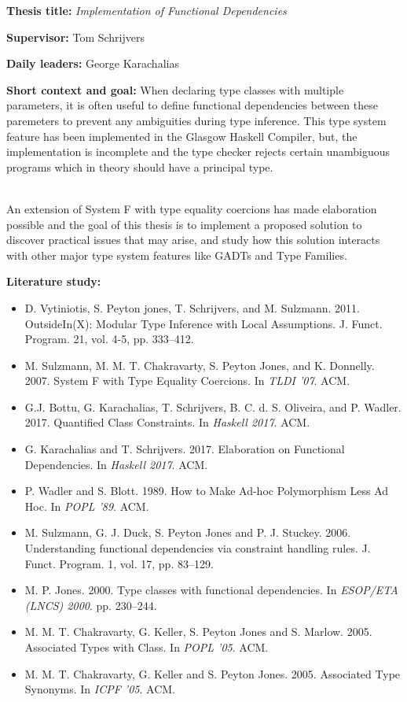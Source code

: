 \documentclass[12pt]{report}
\begin{document}
\pagestyle{myheadings}

{\bf Thesis title:} {\em Implementation of Functional Dependencies}

\vspace{0.5cm}
{\bf Supervisor:} Tom Schrijvers


\vspace{0.5cm}
{\bf Daily leaders:} George Karachalias

\vspace{.5cm}
{\bf Short context and goal: }
When declaring type classes with multiple parameters, it is often useful to
define functional dependencies between these paremeters to prevent any
ambiguities during type inference. This type system feature has been implemented
in the Glasgow Haskell Compiler, but, the implementation is incomplete and the
type checker rejects certain unambiguous programs which in theory should have a
principal type.

\mbox{}\\
An extension of System F with type equality coercions has made elaboration
possible and the goal of this thesis is to implement a proposed solution to
discover practical issues that may arise, and study how this solution interacts
with other major type system features like GADTs and Type Families.

\vspace{.5cm}
{\bf Literature study:}
\begin{itemize}
\item
  D. Vytiniotis, S. Peyton jones, T. Schrijvers, and M. Sulzmann. 2011.
  OutsideIn(X): Modular Type Inference with Local Assumptions. J. Funct.
  Program. 21, vol. 4-5, pp. 333--412.
\item
  M. Sulzmann, M. M. T. Chakravarty, S. Peyton Jones, and K. Donnelly. 2007.
  System F with Type Equality Coercions.
  In \textit{TLDI '07}. ACM.
\item
  G.J. Bottu, G. Karachalias, T. Schrijvers, B. C. d. S. Oliveira, and P. Wadler. 2017.
  Quantified Class Constraints.
  In \textit{Haskell 2017}. ACM.
\item
  G. Karachalias and T. Schrijvers. 2017.
  Elaboration on Functional Dependencies. %
  In \textit{Haskell 2017}. ACM.
\item
  P. Wadler and S. Blott. 1989.
  How to Make Ad-hoc Polymorphism Less Ad Hoc.
  In \textit{POPL '89}. ACM.
\item
  M. Sulzmann, G. J. Duck, S. Peyton Jones and P. J. Stuckey. 2006.
  Understanding functional dependencies via constraint handling rules.
  J. Funct. Program. 1, vol. 17, pp. 83--129.
\item
  M. P. Jones. 2000.
  Type classes with functional dependencies.
  In \textit{ESOP/ETA (LNCS) 2000}. pp. 230--244.
\item
  M. M. T. Chakravarty, G. Keller, S. Peyton Jones and S. Marlow. 2005.
  Associated Types with Class.
  In \textit{POPL '05}. ACM.
\item
  M. M. T. Chakravarty, G. Keller and S. Peyton Jones. 2005.
  Associated Type Synonyms.
  In \textit{ICPF '05}. ACM.
\end{itemize}
\end{document}
